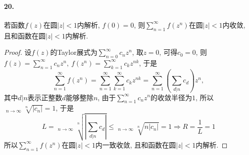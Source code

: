 \documentclass[12pt, a4paper, oneside]{ctexart}
\DeclareMathOperator*\uplim{\overline{lim}} %
\let\leq=\leqslant %
\begin{document}
\paragraph{20.}若函数$f(z)$在圆$|z| < 1$内解析, $f(0) = 0$, 则$\sum_{n=1}^\infty f(z^n)$在圆$|z| < 1$内收敛, 且和函数在圆$|z| < 1$内解析.
\begin{proof}
    设$f(z)$的Taylor展式为$\sum_{n=0}^\infty c_nz^n$, 取$z=0$, 可得$c_0 = 0$, 则$f(z) = \sum_{n=1}^\infty c_nz^n,\ f(z^n) = \sum_{k=1}^\infty c_kz^{nk}$, 于是
    \begin{equation*}
        \sum_{n=1}^\infty f(z^n) = \sum_{n=1}^\infty\sum_{k=1}^\infty c_k z^{nk} = \sum_{n=1}^\infty\left(\sum_{d|n}c_d\right)z^n,
    \end{equation*}
    其中$d|n$表示正整数$d$能够整除$n$, 由于$\sum_{n=1}^\infty c_nz^n$的收敛半径为$1$, 所以$\uplim_{n\to \infty}\sqrt[n]{|c_n|} = 1$, 于是
    \begin{equation*}
        L = \uplim_{n\to \infty}\sqrt[n]{\left|\sum_{d|n}c_d\right|}\leq \uplim_{n\to\infty}\sqrt[n]{n|c_n|} = 1\Rightarrow R=\frac{1}{L}=  1
    \end{equation*}
    所以$\sum_{n=1}^\infty f(z^n)$在圆$|z| < 1$内一致收敛, 且和函数在圆$|z| < 1$内解析.
\end{proof}

\iffalse
\centerline{
    \texttt{[image: figure.png]}
}
\renewcommand\arraystretch{0.8} %
\begin{table}[!htbp] %
    \centering %
    \begin{tabular}{p{1cm}<{\centering}p{1cm}<{\centering}p{3cm}<{\centering}p{5cm}<{\centering}} %
        \toprule
        $x_i$ & $f[x_1]$ & $f[x_i,x_{i+1}]$ & $f[x_i,x_{i+1},x_{i+2}]$ \\
        \midrule
        $x_0$ & $f(x_0)$ &                  &                          \\
        $x_0$ & $f(x_0)$ & $f'(x_0)$        &                          \\
        $x_0$ & $f(x_1)$ & $\frac{f(x_1)-f(x_0)}{x_1-x_0}$ & $\frac{f(x_1)-f(x_0)}{(x_1-x_0)^2}-\frac{f'(x_0)}{x_1-x_0}$\\
        \bottomrule
    \end{tabular}
\end{table}

\def\Log{\text{Log}} %
$\Log$ %
\fi
\end{document}

